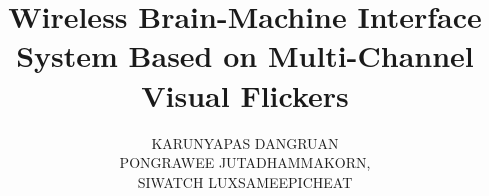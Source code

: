 \documentclass[a4paper,12pt,twoside]{report}
\begin{document}
\title{\LARGE {\bf Wireless Brain-Machine Interface System Based on Multi-Channel Visual Flickers}\\
 \vspace*{6mm}
}

\author{KARUNYAPAS DANGRUAN \\
PONGRAWEE JUTADHAMMAKORN, \\
SIWATCH LUXSAMEEPICHEAT}


\normallinespacing
\maketitle
\preface


%
%

\body









\appendix




\end{document}
